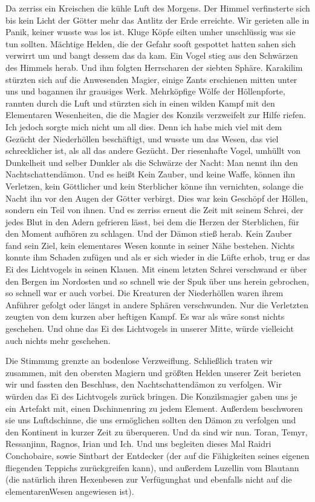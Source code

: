 Da zerriss ein Kreischen die kühle Luft des Morgens. Der Himmel verfinsterte sich bis kein Licht der Götter mehr das Antlitz der Erde erreichte. Wir gerieten alle in Panik, keiner wusste was los ist. Kluge Köpfe eilten umher unschlüssig was sie tun sollten. Mächtige Helden, die der Gefahr sooft gespottet hatten sahen sich verwirrt um und bangt dessem das da kam. Ein Vogel stieg aus den Schwärzen des Himmels herab. Und ihm folgten Herrscharen der siebten Sphäre. Karakilim stürzten sich auf die Anwesenden Magier, einige Zants erschienen mitten unter uns und bagannen ihr grausiges Werk. Mehrköpfige Wölfe der Höllenpforte, rannten durch die Luft und stürzten sich in einen wilden Kampf mit den Elementaren Wesenheiten, die die Magier des Konzils verzweifelt zur Hilfe riefen. Ich jedoch sorgte mich nicht um all dies. Denn ich habe mich viel mit dem Gezücht der Niederhöllen beschäftigt, und wusste um das Wesen, das viel schrecklicher ist, als all das andere Gezücht. Der riesenhafte Vogel, umhüllt von Dunkelheit und selber Dunkler als die Schwärze der Nacht: Man nennt ihn den Nachtschattendämon. Und es heißt Kein Zauber, und keine Waffe, können ihn Verletzen, kein Göttlicher und kein Sterblicher könne ihn vernichten, solange die Nacht ihn vor den Augen der Götter verbirgt. Dies war kein Geschöpf der Höllen, sondern ein Teil von ihnen. Und es zerriss erneut die Zeit mit seinem Schrei, der jedes Blut in den Adern gefrieren lässt, bei dem die Herzen der Sterblichen, für den Moment aufhören zu schlagen. Und der Dämon stieß herab. Kein Zauber fand sein Ziel, kein elementares Wesen konnte in seiner Nähe bestehen. Nichts konnte ihm Schaden zufügen und als er sich wieder in die Lüfte erhob, trug er das Ei des Lichtvogels in seinen Klauen. Mit einem letzten Schrei verschwand er über den Bergen im Nordosten und so schnell wie der Spuk über uns herein gebrochen, so schnell war er auch vorbei. Die Kreaturen der Niederhöllen waren ihrem Anführer gefolgt oder längst in andere Sphären verschwunden. Nur die Verletzten zeugten von dem kurzen aber heftigen Kampf. Es war als wäre sonst nichts geschehen. Und ohne das Ei des Lichtvogels in unserer Mitte, würde vielleicht auch nichts mehr geschehen.

Die Stimmung grenzte an bodenlose Verzweiflung. Schließlich traten wir zusammen, mit den obersten Magiern und größten Helden unserer Zeit berieten wir und fassten den Beschluss, den Nachtschattendämon zu verfolgen. Wir würden das Ei des Lichtvogels zurück bringen. Die Konzilsmagier gaben uns je ein Artefakt mit, einen Dschinnenring zu jedem Element. Außerdem beschworen sie uns Luftdschinne, die uns ermöglichen sollten den Dämon zu verfolgen und den Kontinent in kurzer Zeit zu überqueren. Und da sind wir nun. Toran, Temyr, Ressanjinn, Ragnos, Irian und Ich. Und uns begleiten dieses Mal Raidri Conchobaire, sowie Sintbart der Entdecker (der auf die Fähigkeiten seines eigenen fliegenden Teppichs zurückgreifen kann), und außerdem Luzellin vom Blautann (die natürlich ihren Hexenbesen zur Verfügunghat und ebenfalls nicht auf die elementarenWesen angewiesen ist).

